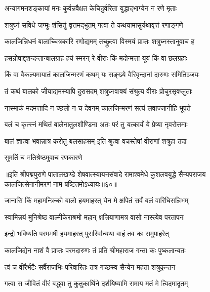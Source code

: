 \twolineshloka
{अन्यागमनशङ्कायां मनः कुर्वन्नवैक्षत}
{केचिदुर्वरिता युद्धाद्भाग्येन न रणे मृताः}%

\twolineshloka
{शत्रुघ्नं सविधे जग्मुः शंसितुं वृत्तमद्भुतम्}
{गत्वा ते कथयामासुर्यथावृत्तं रणाङ्गणे}%

\twolineshloka
{कालजिन्निधनं बालाच्चित्रकारि रणोद्यमम्}
{तच्छ्रुत्वा विस्मयं प्राप्तः शत्रुघ्नस्तानुवाच ह}%

\twolineshloka
{हसन्रोषाद्दशन्दन्तान्बालग्राह हयं स्मरन्}
{रे वीराः किं मदोन्मत्ता यूयं किं वा छलग्रहाः}%

\twolineshloka
{किं वा वैकल्यमायातं कालजिन्मरणं कथम्}
{यः सङ्ख्ये वैरिवृन्दानां दारुणः समितिञ्जयः}%

\twolineshloka
{तं कथं बालको जीयाद्यमस्यापि दुरासदम्}
{शत्रुघ्नवाक्यं संश्रुत्य वीराः प्रोचुरसृक्प्लुताः}%

\twolineshloka
{नास्माकं मदमत्तादि न च्छलो न च देवनम्}
{कालजिन्मरणं सत्यं लवाज्जानीहि भूपते}%

\twolineshloka
{बलं च कृत्स्नं मथितं बालेनातुलशौण्डिना}
{अतः परं तु यत्कार्यं ये प्रेष्या नृवरोत्तमाः}%

\twolineshloka
{बालं ज्ञात्वा भवान्नात्र करोतु बलसाहसम्}
{इति श्रुत्वा वचस्तेषां वीराणां शत्रुहा तदा}%

\onelineshloka
{सुमतिं च मतिश्रेष्ठमुवाच रणकारणे}%

{॥इति श्रीपद्मपुराणे पातालखण्डे शेषवात्स्यायनसंवादे रामाश्वमेधे कुशलवयुद्धे सैन्यपराजय कालजित्सेनानीमरणं नाम षष्टितमोऽध्यायः॥६०॥}



\twolineshloka
{जानासि किं महामन्त्रिन्को बालो हयमाहरत्}
{येन मे क्षपितं सर्वं बलं वारिधिसन्निभम्}%


\twolineshloka
{स्वामिन्नयं मुनिश्रेष्ठ वाल्मीकेराश्रमो महान्}
{क्षत्त्रियाणामत्र वासो नास्त्येव परतापन}%

\twolineshloka
{इन्द्रो भविष्यति परममर्षी हयमाहरत्}
{पुरारिर्वान्यथा वाहं तव कः समुपाहरेत्}%

\twolineshloka
{कालजिद्येन नाशं वै प्राप्तः परमदारुणः}
{तं प्रति श्रीमहाराज गन्ता कः पुष्कलान्यतः}%

\twolineshloka
{त्वं च वीरैर्भटैः सर्वैराजभिः परिवारितः}
{तत्र गच्छस्व सैन्येन महता शत्रुकृन्तन}%

\twolineshloka
{गत्वा स जीवितं वीरं बद्ध्वा तु कुतुकार्थिने}
{दर्शयिष्यामि रामाय मतं मे त्विदमादृतम्}%

